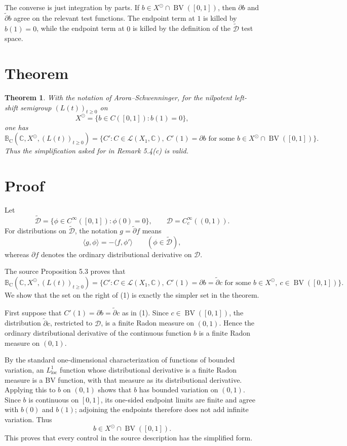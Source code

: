 \documentclass[11pt]{article}
\newcommand{\C}{\mathbb C}
\newcommand{\B}{\mathbb B}
\newcommand{\calL}{\mathcal L}
\newcommand{\calD}{\mathcal D}
\newcommand{\BV}{\operatorname{BV}}
\newcommand{\sun}{\odot}
\newcommand{\widpartial}{\widetilde{\partial}}
\newtheorem{theorem}{Theorem}
\begin{document}
The converse is just integration by parts.  If $b\in X^\sun\cap\BV([0,1])$, then $\partial b$ and $\widpartial b$ agree on the relevant test functions.  The endpoint term at $1$ is killed by $b(1)=0$, while the endpoint term at $0$ is killed by the definition of the $\widetilde{\calD}$ test space.

\section*{Theorem}

\begin{theorem}
With the notation of Arora--Schwenninger, for the nilpotent left-shift semigroup $(L(t))_{t\ge0}$ on
\[
  X^\sun=\{b\in C([0,1]): b(1)=0\},
\]
one has
\[
  \B_{\mathrm C}(\C,X^\sun,(L(t))_{t\ge0})
  =
  \{ C' : C\in\calL(X_1,\C),\ C'(1)=\partial b
  \text{ for some } b\in X^\sun\cap\BV([0,1])\}.
\]
Thus the simplification asked for in Remark 5.4(c) is valid.
\end{theorem}

\section*{Proof}

Let
\[
  \widetilde{\calD}
  =\{\phi\in C^\infty([0,1]):\phi(0)=0\},
  \qquad
  \calD=C_c^\infty((0,1)).
\]
For distributions on $\widetilde{\calD}$, the notation $g=\widpartial f$ means
\[
  \langle g,\phi\rangle=-\langle f,\phi'\rangle
  \qquad(\phi\in\widetilde{\calD}),
\]
whereas $\partial f$ denotes the ordinary distributional derivative on $\calD$.

The source Proposition 5.3 proves that
\[
  \B_{\mathrm C}(\C,X^\sun,(L(t))_{t\ge0})
  =
  \{ C' : C\in\calL(X_1,\C),\ C'(1)=\partial b=\widpartial c
  \text{ for some } b\in X^\sun,\ c\in\BV([0,1])\}.
  \tag{1}
\]
We show that the set on the right of (1) is exactly the simpler set in the theorem.

First suppose that $C'(1)=\partial b=\widpartial c$ as in (1).  Since $c\in\BV([0,1])$, the distribution $\widpartial c$, restricted to $\calD$, is a finite Radon measure on $(0,1)$.  Hence the ordinary distributional derivative of the continuous function $b$ is a finite Radon measure on $(0,1)$.

By the standard one-dimensional characterization of functions of bounded variation, an $L^1_{\mathrm{loc}}$ function whose distributional derivative is a finite Radon measure is a BV function, with that measure as its distributional derivative.  Applying this to $b$ on $(0,1)$ shows that $b$ has bounded variation on $(0,1)$.  Since $b$ is continuous on $[0,1]$, its one-sided endpoint limits are finite and agree with $b(0)$ and $b(1)$; adjoining the endpoints therefore does not add infinite variation.  Thus
\[
  b\in X^\sun\cap\BV([0,1]).
\]
This proves that every control in the source description has the simplified form.
\end{document}

